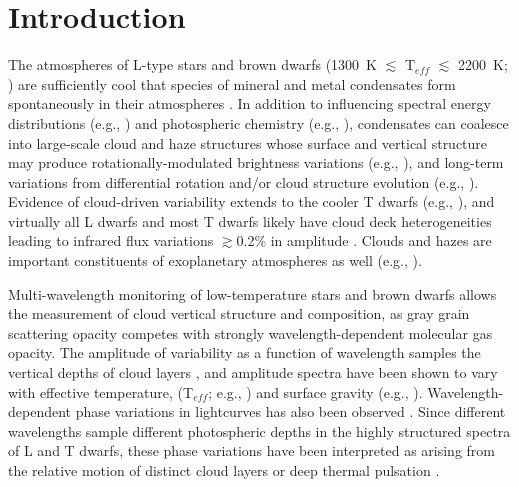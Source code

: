 \documentclass[twocolumn]{aastex6}
\newcommand{\teff}{T$_{eff}$}
\begin{document}



\section{Introduction}

The atmospheres of L-type stars and brown dwarfs (1300~K $\lesssim$ {\teff} $\lesssim$ 2200~K; \citealt{2015ApJ...810..158F}) are sufficiently cool that species of mineral and metal condensates form spontaneously in their atmospheres \citep{1996A&A...305L...1T,2010ApJ...716.1060V}.
In addition to influencing spectral energy distributions (e.g., \citealt{2001ApJ...556..357A,2008ApJ...674..451B}) and photospheric chemistry (e.g., \citealt{2000ApJ...531..438B}), condensates can coalesce into large-scale cloud and haze structures \citep{1989ApJ...338..314L,2001ApJ...556..872A,2014Natur.505..654C}
whose surface and vertical structure may produce rotationally-modulated brightness variations (e.g., \citealt{2012ApJ...750..105R}), and long-term variations from differential rotation and/or cloud structure evolution (e.g., \citealt{2009ApJ...701.1534A,2013A&A...555L...5G,2016ApJ...826....8Y}). Evidence of cloud-driven variability extends to the cooler T dwarfs (e.g., \citealt{2009ApJ...701.1534A,2012ApJ...760L..31B,2015ApJ...799..154M}), and virtually all L dwarfs and most T dwarfs likely have cloud deck heterogeneities leading to infrared flux variations $\gtrsim$0.2\% in amplitude \citep{2015ApJ...799..154M}. Clouds and hazes are important constituents of exoplanetary atmospheres as well (e.g., \citealt{2011ApJ...733...65B,2014Natur.505...69K,2016Natur.529...59S}).

Multi-wavelength monitoring of low-temperature stars and brown dwarfs allows the measurement of cloud vertical structure and composition, as gray grain scattering opacity competes with strongly wavelength-dependent molecular gas opacity. The amplitude of variability as a function of wavelength samples the vertical depths of cloud layers \citep{2013ApJ...768..121A}, and amplitude spectra have been shown to vary with effective temperature, ({\teff}; e.g., \citealt{2015ApJ...798L..13Y}) and surface gravity (e.g., \citealt{2016ApJ...829L..32L}).
Wavelength-dependent phase variations in lightcurves has also been observed \citep{2012ApJ...760L..31B,2013ApJ...778L..10B,2016ApJ...826....8Y}.
Since different wavelengths sample different photospheric depths in the highly structured spectra of L and T dwarfs, these phase variations have been interpreted as arising from the relative motion of distinct cloud layers or deep thermal pulsation \citep{2014ApJ...785..158R}. 
\end{document}
